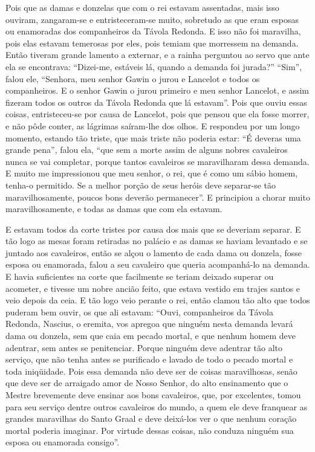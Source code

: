 Pois que as damas e donzelas que com o rei estavam assentadas, mais isso
ouviram, zangaram-se e entristeceram-se muito, sobretudo as que eram esposas ou
enamoradas dos companheiros da Távola Redonda. E isso não foi maravilha, pois
elas estavam temerosas por eles, pois temiam que morressem na demanda. Então
tiveram grande lamento a externar, e a rainha perguntou ao servo que ante ela
se encontrava: “Dizei-me, estáveis lá, quando a demanda foi jurada?” “Sim”,
falou ele, “Senhora, meu senhor Gawin o jurou e Lancelot e todos os
companheiros. E o senhor Gawin o jurou primeiro e meu senhor Lancelot, e assim
fizeram todos os outros da Távola Redonda que lá estavam”. Pois que ouviu essas
coisas, entristeceu-se por causa de Lancelot, pois que pensou que ela fosse
morrer, e não pôde conter, as lágrimas saíram-lhe dos olhos. E respondeu por um
longo momento, estando tão triste, que mais triste não poderia estar: “É
deveras uma grande pena”, falou ela, “que sem a morte assim de alguns nobres
cavaleiros nunca se vai completar, porque tantos cavaleiros se maravilharam
dessa demanda. E muito me impressionou que meu senhor, o rei, que é como um
sábio homem, tenha-o permitido. Se a melhor porção de seus heróis deve
separar-se tão maravilhosamente, poucos bons deverão permanecer”. E principiou
a chorar muito maravilhosamente, e todas as damas que com ela estavam. 

E estavam todos da corte tristes por causa dos mais que se deveriam separar. E
tão logo as mesas foram retiradas no palácio e as damas se haviam levantado e
se juntado aos cavaleiros, então se alçou o lamento de cada dama ou donzela,
fosse esposa ou enamorada, falou a seu cavaleiro que queria acompanhá-lo na
demanda. E havia suficientes na corte que facilmente se teriam deixado superar
ou acometer, e tivesse um nobre ancião feito, que estava vestido em trajes
santos e veio depois da ceia. E tão logo veio perante o rei, então clamou tão
alto que todos puderam bem ouvir, os que ali estavam: “Ouvi, companheiros da
Távola Redonda, Nascius, o eremita, vos apregoa que ninguém nesta demanda
levará dama ou donzela, sem que caia em pecado mortal, e que nenhum homem deve
adentrar, sem antes se penitenciar. Porque ninguém deve adentrar tão alto
serviço, que não tenha antes se purificado e lavado de todo o pecado mortal e
toda iniqüidade. Pois essa demanda não deve ser de coisas maravilhosas, senão
que deve ser de arraigado amor de Nosso Senhor, do alto ensinamento que o
Mestre brevemente deve ensinar aos bons cavaleiros, que, por excelentes, tomou
para seu serviço dentre outros cavaleiros do mundo, a quem ele deve franquear
as grandes maravilhas do Santo Graal e deve deixá-los ver o que nenhum coração
mortal poderia imaginar. Por virtude dessas coisas, não conduza ninguém sua
esposa ou enamorada consigo”. 

